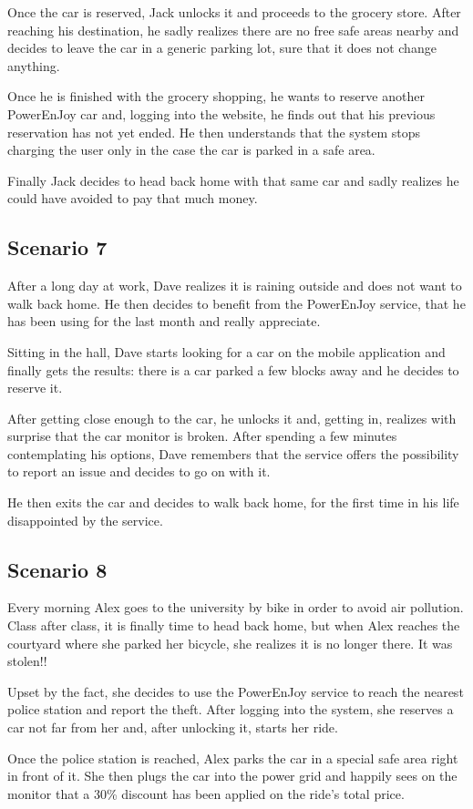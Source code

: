 Once the car is reserved, Jack unlocks it and proceeds to the grocery store. After reaching his destination, he sadly realizes there are no free safe areas nearby and decides to leave the car in a generic parking lot, sure that it does not change anything. 

Once he is finished with the grocery shopping, he wants to reserve another PowerEnJoy car and, logging into the website, he finds out that his previous reservation has not yet ended. He then understands that the system stops charging the user only in the case the car is parked in a safe area. 

Finally Jack decides to head back home with that same car and sadly realizes he could have avoided to pay that much money. 
\subsection{Scenario 7}
After a long day at work, Dave realizes it is raining outside and does not want to walk back home. He then decides to benefit from the PowerEnJoy service, that he has been using for the last month and really appreciate. 

Sitting in the hall, Dave starts looking for a car on the mobile application and finally gets the results: there is a car parked a few blocks away and he decides to reserve it. 

After getting close enough to the car, he unlocks it and, getting in, realizes with surprise that the car monitor is broken. After spending a few minutes contemplating his options, Dave remembers that the service offers the possibility to report an issue and decides to go on with it. 

He then exits the car and decides to walk back home, for the first time in his life disappointed by the service.
\subsection{Scenario 8}
Every morning Alex goes to the university by bike in order to avoid air pollution. Class after class, it is finally time to head back home, but when Alex reaches the courtyard where she parked her bicycle, she realizes it is no longer there. It was stolen!! 

Upset by the fact, she decides to use the PowerEnJoy service to reach the nearest police station and report the theft. After logging into the system, she reserves a car not far from her and, after unlocking it, starts her ride. 

Once the police station is reached, Alex parks the car in a special safe area right in front of it. She then plugs the car into the power grid and happily sees on the monitor that a 30\% discount has been applied on the ride's total price.